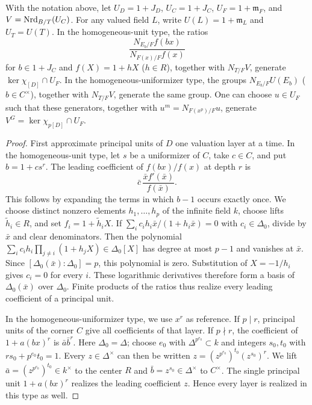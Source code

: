 \begin{lemma}
\label{lem:review-homogeneous-unit-norm-generation}
With the notation above, let $U_D=1+J_D$, $U_C=1+J_C$, $U_F=1+\mathfrak m_F$, and $V=\operatorname{Nrd}_{B/T}(U_C)$.
For any valued field $L$, write $U(L)=1+\mathfrak m_L$ and $U_T=U(T)$.
In the homogeneous-unit type, the ratios
\[
 \frac{N_{E_b/F}f(bx)}{N_{F(x)/F}f(x)}
\]
for $b\in1+J_C$ and $f(X)=1+hX$ ($h\in R$), together with $N_{T/F}V$, generate $\ker\chi_{[D]}\cap U_F$.
In the homogeneous-uniformizer type, the groups $N_{E_b/F}U(E_b)$ ($b\in C^\times$), together with $N_{T/F}V$, generate the same group.
One can choose $u\in U_F$ such that these generators, together with $u^m=N_{F(x^p)/F}u$, generate $V^G=\ker\chi_{p[D]}\cap U_F$.
\end{lemma}
\begin{proof}
First approximate principal units of $D$ one valuation layer at a time.
In the homogeneous-unit type, let $s$ be a uniformizer of $C$, take $c\in C$, and put $b=1+cs^r$.
The leading coefficient of $f(bx)/f(x)$ at depth $r$ is
\[
 \bar c\,\frac{\bar x f'(\bar x)}{f(\bar x)}.
\]
This follows by expanding the terms in which $b-1$ occurs exactly once.
We choose distinct nonzero elements $h_1,\ldots,h_p$ of the infinite field $k$, choose lifts $\widetilde h_i\in R$, and set $f_i=1+\widetilde h_iX$.
If $\sum_i c_i h_i\bar x/(1+h_i\bar x)=0$ with $c_i\in\Delta_0$, divide by $\bar x$ and clear denominators.
Then the polynomial $\sum_i c_i h_i\prod_{j\ne i}(1+h_jX)\in\Delta_0[X]$ has degree at most $p-1$ and vanishes at $\bar x$.
Since $[\Delta_0(\bar x):\Delta_0]=p$, this polynomial is zero.
Substitution of $X=-1/h_i$ gives $c_i=0$ for every $i$.
These logarithmic derivatives therefore form a basis of $\Delta_0(\bar x)$ over $\Delta_0$.
Finite products of the ratios thus realize every leading coefficient of a principal unit.

In the homogeneous-uniformizer type, we use $x^r$ as reference.
If $p\mid r$, principal units of the corner $C$ give all coefficients of that layer.
If $p\nmid r$, the coefficient of $1+a(bx)^r$ is $\bar a\bar b^r$.
Here $\Delta_0=\Delta$; choose $e_0$ with $\Delta^{p^{e_0}}\subset k$ and integers $s_0,t_0$ with $rs_0+p^{e_0}t_0=1$.
Every $z\in\Delta^\times$ can then be written $z=(z^{p^{e_0}})^{t_0}(z^{s_0})^r$.
We lift $\bar a=(z^{p^{e_0}})^{t_0}\in k^\times$ to the center $R$ and $\bar b=z^{s_0}\in\Delta^\times$ to $C^\times$.
The single principal unit $1+a(bx)^r$ realizes the leading coefficient $z$.
Hence every layer is realized in this type as well.


\end{proof}
